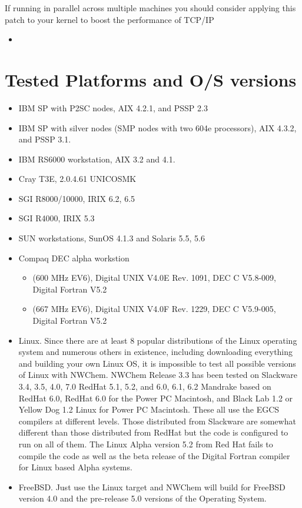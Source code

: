 If running in parallel across multiple machines you should consider
applying this patch to your kernel to boost the performance of TCP/IP
\begin{itemize}
\item {}
\end{itemize}

\section{Tested Platforms and O/S versions}

\begin{itemize}
\item IBM SP with P2SC nodes,  AIX 4.2.1, and PSSP 2.3
\item IBM SP with silver nodes (SMP nodes with two 604e processors),
AIX 4.3.2, and PSSP 3.1.
\item IBM RS6000 workstation, AIX 3.2 and 4.1.
\item Cray T3E, 2.0.4.61 UNICOSMK
\item SGI R8000/10000, IRIX 6.2, 6.5
\item SGI R4000, IRIX 5.3
\item SUN workstations, SunOS 4.1.3 and Solaris 5.5, 5.6
\item Compaq DEC alpha workstion 
\begin{itemize}
\item (600 MHz EV6), Digital UNIX V4.0E Rev. 1091, DEC C V5.8-009, Digital Fortran V5.2
\item (667 MHz EV6), Digital UNIX V4.0F Rev. 1229, DEC C V5.9-005, Digital Fortran V5.2
\end{itemize}
\item Linux. Since there are at least 8 popular distributions of the
Linux operating system and numerous others in existence, including
downloading everything and building your own Linux OS, it is
impossible to test all possible versions of Linux with NWChem. NWChem
Release 3.3 has been tested on Slackware 3.4, 3.5, 4.0, 7.0 RedHat
5.1, 5.2, and 6.0, 6.1, 6.2 Mandrake based on RedHat 6.0, RedHat 6.0 for
the Power PC Macintosh, and Black Lab 1.2 or Yellow Dog 1.2 Linux for
Power PC Macintosh.  These all use the EGCS compilers at different
levels.  Those distributed from Slackware are somewhat different than
those distributed from RedHat but the code is configured to run on all
of them.  The Linux Alpha version 5.2 from Red Hat fails to compile
the code as well as the beta release of the Digital Fortran compiler
for Linux based Alpha systems.  
\item FreeBSD.  Just use the Linux target and NWChem will build for FreeBSD
version 4.0 and the pre-release 5.0 versions of the Operating System.

\end{itemize}
